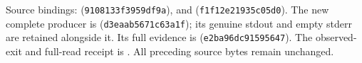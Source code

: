 {\footnotesize\raggedright
Source bindings: 
(\texttt{9108133f3959df9a}), and
(\texttt{f1f12e21935c05d0}).
The new complete producer is
(\texttt{d3eaab5671c63a1f}); its genuine stdout and empty stderr
are retained alongside it. Its full evidence is
(\texttt{e2ba96dc91595647}).
The observed-exit and full-read receipt is
.
All preceding source bytes remain unchanged.\par}
